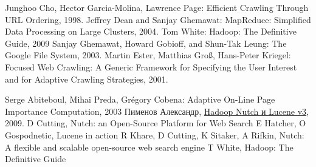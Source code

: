 \documentclass[a4paper,10pt]{report}
\begin{document}
\begin{thebibliography}{9}
 Junghoo Cho, Hector Garcia-Molina, Lawrence Page: Efficient Crawling Through URL Ordering, 1998.
 Jeffrey Dean and Sanjay Ghemawat: MapReduce: Simplified Data Processing on Large Clusters, 2004.
 Tom White: Hadoop: The Definitive Guide, 2009
 Sanjay Ghemawat, Howard Gobioff, and Shun-Tak Leung: The Google File System, 2003.
 Martin Ester, Matthias Groß, Hans-Peter Kriegel: Focused Web Crawling: A Generic Framework for Specifying the User Interest and for Adaptive Crawling Strategies, 2001.

 Serge Abiteboul, Mihai Preda, Grégory Cobena: Adaptive On-Line Page Importance Computation, 2003
 Пименов Александр, \href{http://mmcg.z52.ru/drupal/node/3}{Hadoop Nutch и Lucene v3}, 2009.
 D Cutting, Nutch: an Open-Source Platform for Web Search
 E Hatcher, O Gospodnetic, Lucene in action
 R Khare, D Cutting, K Sitaker, A Rifkin, Nutch: A flexible and scalable open-source web search engine
 T White, Hadoop: The Definitive Guide

\end{thebibliography}
\end{document}
